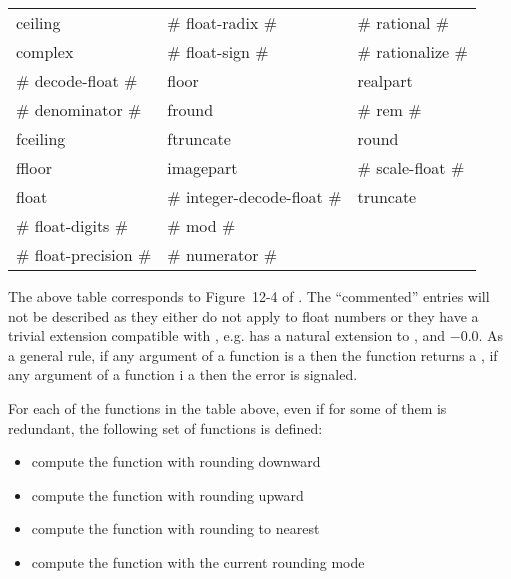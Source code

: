 \documentclass[../../Operations.tex]{subfiles}
\begin{document}
\label{sect:transc-ops}

\begin{tt}
  \begin{tabular}{lll}
    ceiling & \# float-radix \# & \# rational \#\\
    complex &  \# float-sign \# &  \# rationalize \#\\
    \# decode-float \# & floor  &  realpart\\
    \# denominator \# &  fround &  \# rem \#\\
    fceiling & ftruncate &  round\\
    ffloor &  imagepart & \# scale-float \#\\
    float & \# integer-decode-float \# & truncate\\
    \# float-digits \# & \# mod \# & \\
    \# float-precision \# & \# numerator \# & \\
  \end{tabular}
\end{tt}

\vspace*{3mm}

\noindent
The above table corresponds to Figure~12-4 of \cite{1996:ANSIHyperSpec}.
The ``commented'' entries will not be described as they either do not
apply to float numbers or they have a trivial extension
compatible with \cite{2012:LIA1,2001:LIA2,2004:LIA3}, e.g. 
has a natural extension to ,
 and $-0.0$. As a general rule, if any argument of a
function is a  then the function returns a
, if any argument of a function i a
 then the
 error is signaled.

\noindent
For each of the functions in the table above, even if for some of them is
redundant, the following set of functions is defined:
\begin{itemize}
\item {} compute the function with rounding downward
\item {} compute the function with rounding upward
\item {} compute the function with rounding to nearest
\item {} compute the function with the current rounding mode
\end{itemize}
\vspace*{3mm}





\end{document}
